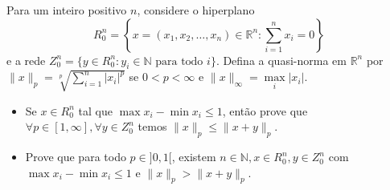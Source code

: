 Para um inteiro positivo \(n\), considere o hiperplano
\[ R_0^n = \left\{x = (x_1, x_2, \dots, x_n) \in \mathbb{R}^n : \sum_{i=1}^n x_i = 0\right\} \]
e a rede
\( Z_0^n = \{y \in R_0^n : y_i \in \mathbb{N} \text{ para todo } i\} \).
Defina a quasi-norma em \(\mathbb{R}^n\) por \(\|x\|_p= \sqrt[p]{\sum^{n}_{i=1}|x_i|^p}\) se \(0<p<\infty\) e \(\|x\|_{\infty} = \max\limits_i |x_i|\).
\begin{itemize}
\item[(a)] Se \(x\in R^n_0\) tal que \(\max x_i - \min x_i \le 1\), então prove que \(\forall p \in [1,\infty], \forall y \in Z^n_0\) temos \(\|x\|_p\le\|x+y\|_p\).
\item[(b)] Prove que para todo \(p\in ]0,1[\), existem \(n \in \mathbb{N}, x\in R^n_0, y\in Z^n_0\) com \(\max x_i - \min x_i \le 1\) e \(\|x\|_p>\|x+y\|_p\).
\end{itemize}
